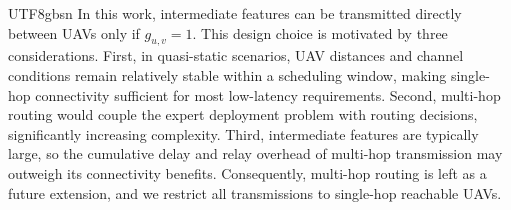 \documentclass[journal]{IEEEtran}
\begin{document}
\begin{CJK*}{UTF8}{gbsn}
In this work, intermediate features can be transmitted directly between UAVs only if \(g_{u,v} = 1\). This design choice is motivated by three considerations. First, in quasi-static scenarios, UAV distances and channel conditions remain relatively stable within a scheduling window, making single-hop connectivity sufficient for most low-latency requirements. Second, multi-hop routing would couple the expert deployment problem with routing decisions, significantly increasing complexity. Third, intermediate features are typically large, so the cumulative delay and relay overhead of multi-hop transmission may outweigh its connectivity benefits. Consequently, multi-hop routing is left as a future extension, and we restrict all transmissions to single-hop reachable UAVs.




\end{CJK*}
\end{document}

